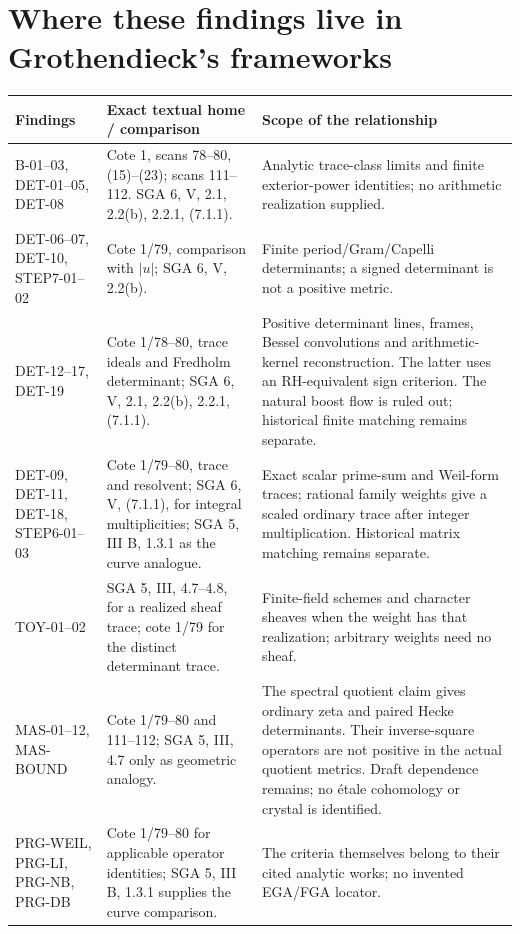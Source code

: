 \section{Where these findings live in Grothendieck's frameworks}
\begin{longtable}{>{\raggedright\arraybackslash}p{}>{\raggedright\arraybackslash}p{}>{\raggedright\arraybackslash}p{}}
\toprule
Findings & Exact textual home / comparison & Scope of the relationship\\\midrule\endhead
B-01--03, DET-01--05, DET-08 & Cote 1, scans 78--80, (15)--(23); scans 111--112. SGA 6, V, 2.1, 2.2(b), 2.2.1, (7.1.1). & Analytic trace-class limits and finite exterior-power identities; no arithmetic realization supplied.\\
DET-06--07, DET-10, STEP7-01--02 & Cote 1/79, comparison with $|u|$; SGA 6, V, 2.2(b). & Finite period/Gram/Capelli determinants; a signed determinant is not a positive metric.\\
DET-12--17, DET-19 & Cote 1/78--80, trace ideals and Fredholm determinant; SGA 6, V, 2.1, 2.2(b), 2.2.1, (7.1.1). & Positive determinant lines, frames, Bessel convolutions and arithmetic-kernel reconstruction. The latter uses an RH-equivalent sign criterion. The natural boost flow is ruled out; historical finite matching remains separate.\\
DET-09, DET-11, DET-18, STEP6-01--03 & Cote 1/79--80, trace and resolvent; SGA 6, V, (7.1.1), for integral multiplicities; SGA 5, III B, 1.3.1 as the curve analogue. & Exact scalar prime-sum and Weil-form traces; rational family weights give a scaled ordinary trace after integer multiplication. Historical matrix matching remains separate.\\
TOY-01--02 & SGA 5, III, 4.7--4.8, for a realized sheaf trace; cote 1/79 for the distinct determinant trace. & Finite-field schemes and character sheaves when the weight has that realization; arbitrary weights need no sheaf.\\
MAS-01--12, MAS-BOUND & Cote 1/79--80 and 111--112; SGA 5, III, 4.7 only as geometric analogy. & The spectral quotient claim gives ordinary zeta and paired Hecke determinants. Their inverse-square operators are not positive in the actual quotient metrics. Draft dependence remains; no \'etale cohomology or crystal is identified.\\
PRG-WEIL, PRG-LI, PRG-NB, PRG-DB & Cote 1/79--80 for applicable operator identities; SGA 5, III B, 1.3.1 supplies the curve comparison. & The criteria themselves belong to their cited analytic works; no invented EGA/FGA locator.\\

\end{longtable}
